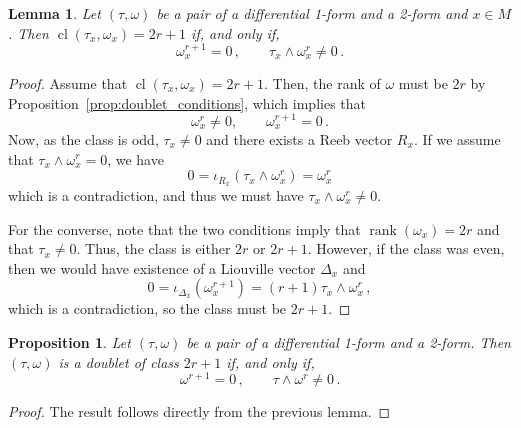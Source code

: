 \documentclass[11pt,twoside]{article}
\theoremstyle{plain}
\newtheorem{proposition}[theorem]{Proposition}
\newtheorem{lemma}[theorem]{Lemma}
\theoremstyle{definition}
\newtheorem{remark}[theorem]{Remark}
\newcommand*{\inn}[1]{\iota_{#1}}
\DeclareMathOperator{\rk}{rank}
\DeclareMathOperator{\cl}{cl}
\begin{document}
\begin{lemma}\label{lem:odd_conditions}
    Let $(\tau,\omega)$ be a pair of a differential 1-form and a 2-form and $x\in M$.  
Then $\cl(\tau_x,\omega_x)=2r+1$ if, and only if,
    \begin{equation}
            \omega_x ^{r+1} = 0\,,
            \qquad
            \tau_x \wedge \omega_x^r \neq 0\,.
    \end{equation}
\end{lemma}
\begin{proof}
    Assume that $\cl(\tau_x ,\omega_x)=2r+1$. Then, the rank of $\omega$ must be $2r$ by Proposition~\ref{prop:doublet_conditions}, which implies that
    $$\omega_x^{r}\neq 0, \qquad
            \omega_x ^{r+1} = 0\,.$$
    Now, as the class is odd, $\tau_x\neq 0$ and there exists a Reeb vector $R_x$. If we assume that $\tau_x \wedge \omega_x ^r = 0$, we have
    $$0=\inn{R_x} (\tau_x\wedge \omega_x^{r})= \omega_x^r$$
    which is a contradiction, and thus we must have $\tau_x \wedge \omega_x^r \neq 0$.
    
    For the converse, note that the two conditions imply that $\rk(\omega_x)=2r$ and that $\tau_x\neq0$. Thus, the class is either $2r$ or $2r+1$. However, if the class was even, then we would have existence of a Liouville vector $\Delta_x$ and 
    $$0=\inn{\Delta_x} (\omega_x^{r+1}) =(r+1)\tau_x \wedge \omega_x ^r\,,$$
    which is a contradiction, so the class must be $2r+1$.
\end{proof}

\begin{proposition}\label{conditions_odd_class}
   Let $(\tau,\omega)$ be a pair of a differential 1-form and a 2-form.  
Then $(\tau,\omega)$ is a doublet of class $2r+1$ if, and only if,
    \begin{equation}\label{eq:odd_conditions}
            \omega ^{r+1} = 0\,,
            \qquad
            \tau \wedge \omega^r \neq 0\,.
    \end{equation}
\end{proposition}
\begin{proof}
    The result follows directly from the previous lemma.
\end{proof}

\end{document}
